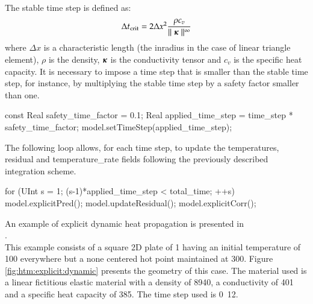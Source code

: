 The stable time step is defined as:
\begin{equation}\label{eqn:htm:explicit:stabletime}
  \Delta t_{{\mathrm{crit}}} = 2 \Delta x^2 \frac{\rho c_v}{\mid\mid \boldsymbol{\kappa} \mid\mid^\infty}
\end{equation}
where $\Delta  x$ is a  characteristic length (\eg  the inradius in the  case of
linear triangle  element), $\rho$ is the density, $\boldsymbol{\kappa}$ is the conductivity tensor
and $c_v$ is the specific heat capacity. It is
necessary to impose a  time step that is smaller than the  stable time step, for
instance, by  multiplying the stable time  step by a safety  factor smaller than
one.

\begin{cpp}
  const Real safety_time_factor = 0.1;
  Real applied_time_step = time_step * safety_time_factor;
  model.setTimeStep(applied_time_step);
\end{cpp}


The following loop  allows, for each time  step, to update the  temperatures, residual and
temperature\_rate  fields  following the previously described integration scheme.

\begin{cpp}
  for (UInt s = 1; (s-1)*applied_time_step < total_time; ++s) {
    model.explicitPred();
    model.updateResidual();
    model.explicitCorr();  
  }
\end{cpp}

An    example    of    explicit     dynamic    heat propagation is    presented    in \\
.  \\
This example  consists of a square 2D plate of \unit{1}{\squaremetre} 
having an initial temperature of \unit{100}{\kelvin} everywhere but a none centered hot point 
maintained at \unit{300}{\kelvin}. Figure \ref{fig:htm:explicit:dynamic} presents the
geometry of this case. The material used is a linear fictitious elastic material
with  a density  of  \unit{8940}{\kilogrampercubicmetre}, a  conductivity of 
\unit{401}{\watt\per\metre\per\kelvin} and a specific heat capacity of \unit{385}{\joule\per\kelvin\per\kilogram}. The time step used is \unit{0.12}{\second}.

